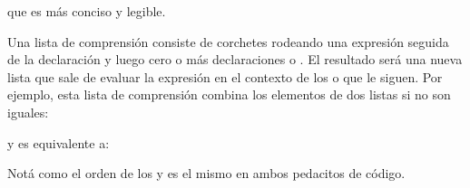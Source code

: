 \documentclass[a5paper,10pt,spanish]{sphinxmanual}
\begin{document}
\sphinxAtStartPar
que es más conciso y legible.

\sphinxAtStartPar
Una lista de comprensión consiste de corchetes rodeando una expresión seguida de la declaración  y luego cero o más declaraciones  o .  El resultado será una nueva lista que sale de evaluar la expresión en el contexto de los  o  que le siguen.  Por ejemplo, esta lista de comprensión combina los elementos de dos listas si no son iguales:

\begin{sphinxVerbatim}[commandchars=\\\{\}]
\PYG{p}{[}     \PYG{p}{[}\PYG{p}{]}    \PYG{p}{[}\PYG{p}{]}    \PYG{p}{]}
\end{sphinxVerbatim}

\sphinxAtStartPar
y es equivalente a:

\begin{sphinxVerbatim}[commandchars=\\\{\}]
  \PYG{p}{[}\PYG{p}{]}
   \PYG{p}{[}\PYG{p}{]}
       \PYG{p}{[}\PYG{p}{]}
           
             
\end{sphinxVerbatim}

\sphinxAtStartPar
Notá como el orden de los  y  es el mismo en ambos pedacitos de código.
\end{document}
